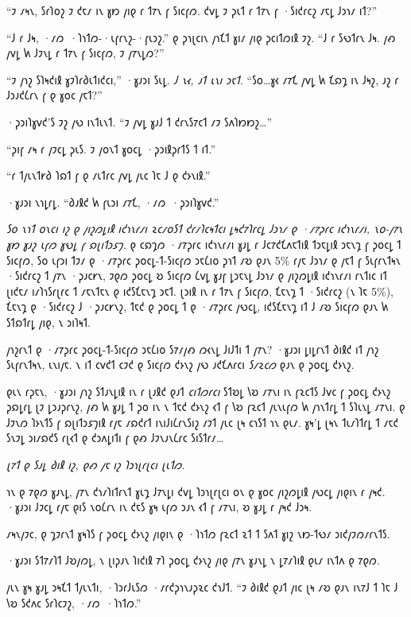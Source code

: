 “𐑲 𐑥𐑰𐑯, 𐑕𐑩𐑐𐑴𐑟 𐑲 𐑒𐑱𐑥 𐑦𐑯 𐑣𐑽 𐑢𐑦𐑞 𐑩 𐑑𐑳𐑯 𐑝 𐑕𐑦𐑤𐑝𐑼. 𐑒𐑫𐑛 𐑲 𐑜𐑧𐑑 𐑩 𐑑𐑳𐑯 𐑝 ·𐑕𐑦𐑒𐑩𐑤𐑟 𐑥𐑱𐑛 𐑓𐑮𐑪𐑥 𐑦𐑑?”

“𐑓 𐑩 𐑓𐑰, ·𐑥𐑼~·𐑐𐑪𐑑𐑼-·𐑧𐑝𐑩𐑯𐑟-·𐑝𐑧𐑮𐑟.” 𐑞 𐑜𐑪𐑚𐑤𐑦𐑯 𐑢𐑪𐑗𐑑 𐑣𐑦𐑥 𐑢𐑦𐑞 𐑜𐑤𐑦𐑑𐑼𐑦𐑙 𐑲𐑟. “𐑓 𐑩 𐑕𐑻𐑑𐑩𐑯 𐑓𐑰. 𐑢𐑺 𐑢𐑫𐑛 𐑿 𐑓𐑲𐑯𐑛 𐑩 𐑑𐑳𐑯 𐑝 𐑕𐑦𐑤𐑝𐑼, 𐑲 𐑢𐑳𐑯𐑛𐑼?”

“𐑲 𐑢𐑪𐑟 𐑕𐑐𐑰𐑒𐑦𐑙 𐑣𐑲𐑐𐑩𐑔𐑧𐑑𐑦𐑒𐑤𐑦,” ·𐑣𐑨𐑮𐑦 𐑕𐑧𐑛. \emph{𐑓 𐑯𐑬, 𐑨𐑑 𐑧𐑯𐑦 𐑮𐑱𐑑.} “𐑕𐑴…𐑣𐑬 𐑥𐑳𐑗 𐑢𐑫𐑛 𐑿 𐑗𐑸𐑡 𐑦𐑯 𐑓𐑰𐑟, 𐑨𐑟 𐑩 𐑓𐑮𐑨𐑒𐑖𐑩𐑯 𐑝 𐑞 𐑣𐑴𐑤 𐑢𐑱𐑑?”

·𐑜𐑮𐑦𐑐𐑣𐑫𐑒'𐑕 𐑲𐑟 𐑢𐑻 𐑦𐑯𐑑𐑧𐑯𐑑. “𐑲 𐑢𐑫𐑛 𐑣𐑨𐑓 𐑑 𐑒𐑩𐑯𐑕𐑳𐑤𐑑 𐑥𐑲 𐑕𐑵𐑐𐑽𐑽𐑟…”

“𐑜𐑦𐑝 𐑥𐑰 𐑩 𐑢𐑲𐑤𐑛 𐑜𐑧𐑕. 𐑲 𐑢𐑴𐑯𐑑 𐑣𐑴𐑤𐑛 ·𐑜𐑮𐑦𐑙𐑜𐑩𐑑𐑕 𐑑 𐑦𐑑.”

“𐑩 𐑑𐑢𐑧𐑯𐑑𐑾𐑔 𐑐𐑸𐑑 𐑝 𐑞 𐑥𐑧𐑑𐑩𐑤 𐑢𐑫𐑛 𐑢𐑧𐑤 𐑐𐑱 𐑓 𐑞 𐑒𐑶𐑯𐑦𐑙.”

·𐑣𐑨𐑮𐑦 𐑯𐑪𐑛𐑩𐑛. “𐑔𐑨𐑙𐑒 𐑿 𐑝𐑧𐑮𐑦 𐑥𐑳𐑗, ·𐑥𐑼~·𐑜𐑮𐑦𐑐𐑣𐑫𐑒.”

\emph{𐑕𐑴 𐑯𐑪𐑑 𐑴𐑯𐑤𐑦 𐑦𐑟 𐑞 𐑢𐑦𐑟𐑼𐑛𐑦𐑙 𐑦𐑒𐑪𐑯𐑩𐑥𐑦 𐑷𐑤𐑥𐑴𐑕𐑑 𐑒𐑩𐑥𐑐𐑤𐑰𐑑𐑤𐑦 𐑛𐑰𐑒𐑳𐑐𐑩𐑤𐑛 𐑓𐑮𐑪𐑥 𐑞 ·𐑥𐑳𐑜𐑩𐑤 𐑦𐑒𐑪𐑯𐑩𐑥𐑦, 𐑯𐑴-𐑢𐑳𐑯 𐑣𐑽 𐑣𐑨𐑟 𐑧𐑝𐑼 𐑣𐑻𐑛 𐑝 𐑸𐑚𐑦𐑑𐑮𐑭𐑠.} 𐑞 𐑤𐑸𐑡𐑼 ·𐑥𐑳𐑜𐑩𐑤 𐑦𐑒𐑪𐑯𐑩𐑥𐑦 𐑣𐑨𐑛 𐑩 𐑓𐑤𐑳𐑒𐑗𐑵𐑱𐑑𐑦𐑙 𐑑𐑮𐑱𐑛𐑦𐑙 𐑮𐑱𐑯𐑡 𐑝 𐑜𐑴𐑤𐑛 𐑑 𐑕𐑦𐑤𐑝𐑼, 𐑕𐑴 𐑧𐑝𐑮𐑦 𐑑𐑲𐑥 𐑞 ·𐑥𐑳𐑜𐑩𐑤 𐑜𐑴𐑤𐑛-𐑑-𐑕𐑦𐑤𐑝𐑼 𐑮𐑱𐑖𐑦𐑴 𐑜𐑪𐑑 𐑥𐑹 𐑞𐑨𐑯 5\% 𐑩𐑢𐑱 𐑓𐑮𐑪𐑥 𐑞 𐑢𐑱𐑑 𐑝 𐑕𐑧𐑝𐑩𐑯𐑑𐑰𐑯 ·𐑕𐑦𐑒𐑩𐑤𐑟 𐑑 𐑢𐑳𐑯 ·𐑜𐑨𐑤𐑾𐑯, 𐑲𐑞𐑼 𐑜𐑴𐑤𐑛 𐑹 𐑕𐑦𐑤𐑝𐑼 𐑖𐑫𐑛 𐑣𐑨𐑝 𐑛𐑮𐑱𐑯𐑛 𐑓𐑮𐑪𐑥 𐑞 𐑢𐑦𐑟𐑼𐑛𐑦𐑙 𐑦𐑒𐑪𐑯𐑩𐑥𐑦 𐑩𐑯𐑑𐑦𐑤 𐑦𐑑 𐑚𐑦𐑒𐑱𐑥 𐑦𐑥𐑐𐑪𐑕𐑩𐑚𐑩𐑤 𐑑 𐑥𐑱𐑯𐑑𐑱𐑯 𐑞 𐑦𐑒𐑕𐑗𐑱𐑯𐑡 𐑮𐑱𐑑. 𐑚𐑮𐑦𐑙 𐑦𐑯 𐑩 𐑑𐑳𐑯 𐑝 𐑕𐑦𐑤𐑝𐑼, 𐑗𐑱𐑯𐑡 𐑑 ·𐑕𐑦𐑒𐑩𐑤𐑟 (𐑯 𐑐𐑱 5\%), 𐑗𐑱𐑯𐑡 𐑞 ·𐑕𐑦𐑒𐑩𐑤𐑟 𐑓 ·𐑜𐑨𐑤𐑾𐑯𐑟, 𐑑𐑱𐑒 𐑞 𐑜𐑴𐑤𐑛 𐑑 𐑞 ·𐑥𐑳𐑜𐑩𐑤 𐑢𐑻𐑤𐑛, 𐑦𐑒𐑕𐑗𐑱𐑯𐑡 𐑦𐑑 𐑓 𐑥𐑹 𐑕𐑦𐑤𐑝𐑼 𐑞𐑨𐑯 𐑿 𐑕𐑑𐑸𐑑𐑩𐑛 𐑢𐑦𐑞, 𐑯 𐑮𐑦𐑐𐑰𐑑.

𐑢𐑪𐑟𐑩𐑯𐑑 𐑞 ·𐑥𐑳𐑜𐑩𐑤 𐑜𐑴𐑤𐑛-𐑑-𐑕𐑦𐑤𐑝𐑼 𐑮𐑱𐑖𐑦𐑴 𐑕𐑳𐑥𐑢𐑺 𐑼𐑬𐑯𐑛 𐑓𐑦𐑓𐑑𐑦 𐑑 𐑢𐑳𐑯? ·𐑣𐑨𐑮𐑦 𐑛𐑦𐑛𐑩𐑯𐑑 𐑔𐑦𐑙𐑒 𐑦𐑑 𐑢𐑪𐑟 𐑕𐑧𐑝𐑩𐑯𐑑𐑰𐑯, 𐑧𐑯𐑦𐑢𐑱. 𐑯 𐑦𐑑 𐑤𐑫𐑒𐑑 𐑤𐑲𐑒 𐑞 𐑕𐑦𐑤𐑝𐑼 𐑒𐑶𐑯𐑟 𐑢𐑻 𐑨𐑒𐑗𐑵𐑩𐑤𐑦 \emph{𐑕𐑥𐑷𐑤𐑼} 𐑞𐑨𐑯 𐑞 𐑜𐑴𐑤𐑛 𐑒𐑶𐑯𐑟.

𐑞𐑧𐑯 𐑩𐑜𐑱𐑯, ·𐑣𐑨𐑮𐑦 𐑢𐑪𐑟 𐑕𐑑𐑨𐑯𐑛𐑦𐑙 𐑦𐑯 𐑩 𐑚𐑨𐑙𐑒 𐑞𐑨𐑑 \emph{𐑤𐑦𐑑𐑼𐑩𐑤𐑦} 𐑕𐑑𐑹𐑛 𐑘𐑹 𐑥𐑳𐑯𐑦 𐑦𐑯 𐑝𐑷𐑤𐑑𐑕 𐑓𐑫𐑤 𐑝 𐑜𐑴𐑤𐑛 𐑒𐑶𐑯𐑟 𐑜𐑸𐑛𐑩𐑛 𐑚𐑲 𐑛𐑮𐑨𐑜𐑩𐑯𐑟, 𐑢𐑺 𐑿 𐑣𐑨𐑛 𐑑 𐑜𐑴 𐑦𐑯 𐑯 𐑑𐑱𐑒 𐑒𐑶𐑯𐑟 𐑬𐑑 𐑝 𐑘𐑹 𐑝𐑷𐑤𐑑 𐑢𐑧𐑯𐑧𐑝𐑼 𐑿 𐑢𐑪𐑯𐑑𐑩𐑛 𐑑 𐑕𐑐𐑧𐑯𐑛 𐑥𐑳𐑯𐑦. 𐑞 𐑓𐑲𐑯𐑼 𐑐𐑶𐑯𐑑𐑕 𐑝 𐑸𐑚𐑦𐑑𐑮𐑭𐑠𐑦𐑙 𐑩𐑢𐑱 𐑥𐑸𐑒𐑩𐑑 𐑦𐑯𐑦𐑓𐑦𐑖𐑩𐑯𐑕𐑦𐑟 𐑥𐑲𐑑 𐑢𐑧𐑤 𐑚𐑰 𐑤𐑪𐑕𐑑 𐑪𐑯 𐑞𐑧𐑥. 𐑣𐑰'𐑛 𐑚𐑰𐑯 𐑑𐑧𐑥𐑐𐑑𐑩𐑛 𐑑 𐑥𐑱𐑒 𐑕𐑯𐑲𐑛 𐑮𐑦𐑥𐑸𐑒𐑕 𐑩𐑚𐑬𐑑 𐑞 𐑒𐑮𐑵𐑛𐑦𐑑𐑦 𐑝 𐑞𐑺 𐑓𐑲𐑯𐑨𐑯𐑖𐑩𐑤 𐑕𐑦𐑕𐑑𐑩𐑥…

\emph{𐑚𐑳𐑑 𐑞 𐑕𐑨𐑛 𐑔𐑦𐑙 𐑦𐑟, 𐑞𐑺 𐑢𐑱 𐑦𐑟 𐑐𐑮𐑪𐑚𐑩𐑚𐑤𐑦 𐑚𐑧𐑑𐑼.}

𐑪𐑯 𐑞 𐑳𐑞𐑼 𐑣𐑨𐑯𐑛, 𐑢𐑳𐑯 𐑒𐑪𐑥𐑐𐑦𐑑𐑩𐑯𐑑 𐑣𐑧𐑡 𐑓𐑳𐑯𐑛𐑦 𐑒𐑫𐑛 𐑐𐑮𐑪𐑚𐑩𐑚𐑤𐑦 𐑴𐑯 𐑞 𐑣𐑴𐑤 𐑢𐑦𐑟𐑼𐑛𐑦𐑙 𐑢𐑻𐑤𐑛 𐑢𐑦𐑞𐑦𐑯 𐑩 𐑢𐑰𐑒. ·𐑣𐑨𐑮𐑦 𐑓𐑲𐑤𐑛 𐑩𐑢𐑱 𐑞𐑦𐑕 𐑯𐑴𐑖𐑩𐑯 𐑦𐑯 𐑒𐑱𐑕 𐑣𐑰 𐑧𐑝𐑼 𐑮𐑨𐑯 𐑬𐑑 𐑝 𐑥𐑳𐑯𐑦, 𐑹 𐑣𐑨𐑛 𐑩 𐑢𐑰𐑒 𐑓𐑮𐑰.

𐑥𐑰𐑯𐑢𐑲𐑤, 𐑞 𐑡𐑲𐑩𐑯𐑑 𐑣𐑰𐑐𐑕 𐑝 𐑜𐑴𐑤𐑛 𐑒𐑶𐑯𐑟 𐑢𐑦𐑞𐑦𐑯 𐑞 ·𐑐𐑪𐑑𐑼 𐑝𐑷𐑤𐑑 𐑷𐑑 𐑑 𐑕𐑵𐑑 𐑣𐑦𐑟 𐑯𐑽-𐑑𐑻𐑥 𐑮𐑦𐑒𐑢𐑲𐑼𐑥𐑩𐑯𐑑𐑕.

·𐑣𐑨𐑮𐑦 𐑕𐑑𐑳𐑥𐑐𐑑 𐑓𐑹𐑢𐑼𐑛, 𐑯 𐑚𐑦𐑜𐑨𐑯 𐑐𐑦𐑒𐑦𐑙 𐑳𐑐 𐑜𐑴𐑤𐑛 𐑒𐑶𐑯𐑟 𐑢𐑦𐑞 𐑢𐑳𐑯 𐑣𐑨𐑯𐑛 𐑯 𐑛𐑳𐑥𐑐𐑦𐑙 𐑞𐑧𐑥 𐑦𐑯𐑑𐑵 𐑞 𐑳𐑞𐑼.

𐑢𐑧𐑯 𐑣𐑰 𐑣𐑨𐑛 𐑮𐑰𐑗𐑑 𐑑𐑢𐑧𐑯𐑑𐑦, ·𐑐𐑮𐑩𐑓𐑧𐑕𐑼 ·𐑥𐑩𐑒𐑜𐑪𐑯𐑨𐑜𐑷𐑤 𐑒𐑪𐑓𐑑. “𐑲 𐑔𐑦𐑙𐑒 𐑞𐑨𐑑 𐑢𐑦𐑤 𐑚𐑰 𐑥𐑹 𐑞𐑨𐑯 𐑦𐑯𐑳𐑓 𐑑 𐑐𐑱 𐑓 𐑘𐑹 𐑕𐑒𐑵𐑤 𐑕𐑩𐑐𐑤𐑲𐑟, ·𐑥𐑼~·𐑐𐑪𐑑𐑼.”


